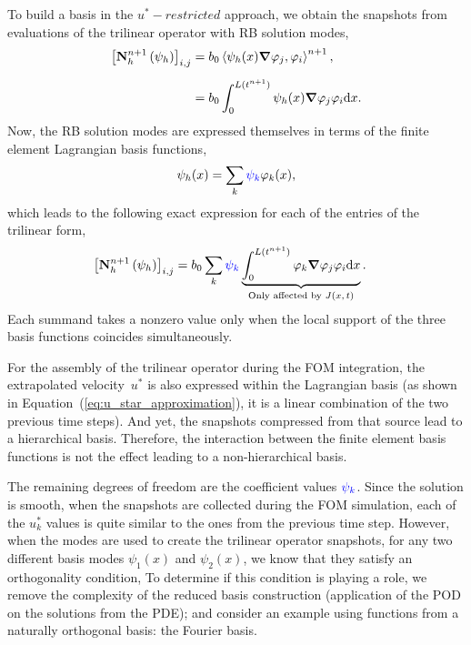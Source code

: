 \documentclass[../../thesis.tex]{subfiles}
\newcommand{\inner}[2]{\left<#1, #2\right>}
\newcommand{\Ah}[1]{\ensuremath{\vb{#1}^{n+1}_h}}
\begin{document}
To build a basis in the $u^{*}-restricted$ approach, 
we obtain the snapshots from evaluations of the trilinear operator with RB solution modes,
\begin{equation}
    \begin{split}
        \qty[\Ah{N}\left(\psi_{h}\right)]_{i,j}
        &= b_0 \inner{\psi_h(x)\grad \varphi_j}{\varphi_i}^{n+1},
        \\[2mm]
        &= b_0 \int_{0}^{L(t^{n+1})} \psi_h(x) \grad \varphi_j \varphi_i \dd x.
    \end{split}
\end{equation}
Now, the RB solution modes are expressed themselves in terms of 
the finite element Lagrangian basis functions,
\begin{equation}
    \psi_h(x) = \sum_{k} 
    \textcolor{blue}{\psi_k} 
    \varphi_{k}(x),
\end{equation}
which leads to the following exact expression for each of the entries of the trilinear form,
\begin{equation}
    \begin{split}
        \qty[\Ah{N}\left(\psi_{h}\right)]_{i,j}
        &= b_0 \sum_k 
        \textcolor{blue}{\psi_k} 
        \underbrace{\int_{0}^{L(t^{n+1})} 
        \varphi_{k} \grad \varphi_j \varphi_i \dd x}_{\text{Only affected by $J(x, t)$}}.
    \end{split}
    \label{eq:appendix_exact_representation_triliear_form}
\end{equation}
Each summand takes a nonzero value only when the local support of the three
basis functions coincides simultaneously.

For the assembly of the trilinear operator during the FOM integration, 
the extrapolated velocity~$u^{*}$ is also expressed within the Lagrangian basis
(as shown in Equation~(\ref{eq:u_star_approximation}), 
it is a linear combination of the two previous time steps).
And yet, the snapshots compressed from that source lead to a hierarchical basis.
Therefore, the interaction between the finite element basis functions
is not the effect leading to a non-hierarchical basis.

The remaining degrees of freedom are the coefficient values 
$\textcolor{blue}{\psi_k}$.
Since the solution is smooth,
when the snapshots are collected during the FOM simulation, 
each of the $u_k^{*}$ values is quite similar to the ones from the previous time step.
However, when the modes are used to create 
the trilinear operator snapshots, 
for any two different basis modes $\psi_1(x)$ and $\psi_2(x)$,
we know that they satisfy an orthogonality condition,
To determine if this condition is playing a role, 
we remove the complexity of the reduced basis construction 
(application of the POD on the solutions from the PDE);
and consider an example using functions from a naturally orthogonal basis:
the Fourier basis.
\end{document}
